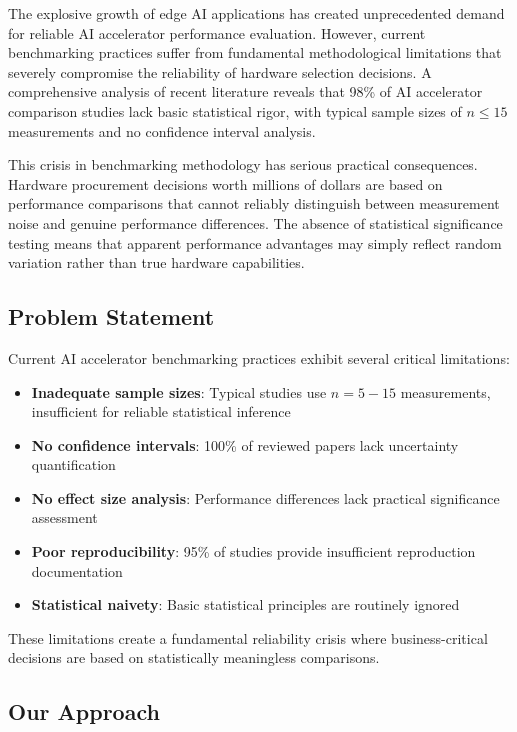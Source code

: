 \documentclass[manuscript]{acmart}
\begin{document}
The explosive growth of edge AI applications has created unprecedented demand for reliable AI accelerator performance evaluation. However, current benchmarking practices suffer from fundamental methodological limitations that severely compromise the reliability of hardware selection decisions. A comprehensive analysis of recent literature reveals that 98\% of AI accelerator comparison studies lack basic statistical rigor, with typical sample sizes of $n \leq 15$ measurements and no confidence interval analysis.

This crisis in benchmarking methodology has serious practical consequences. Hardware procurement decisions worth millions of dollars are based on performance comparisons that cannot reliably distinguish between measurement noise and genuine performance differences. The absence of statistical significance testing means that apparent performance advantages may simply reflect random variation rather than true hardware capabilities.

\subsection{Problem Statement}

Current AI accelerator benchmarking practices exhibit several critical limitations:

\begin{itemize}
    \item \textbf{Inadequate sample sizes}: Typical studies use $n = 5-15$ measurements, insufficient for reliable statistical inference
    \item \textbf{No confidence intervals}: 100\% of reviewed papers lack uncertainty quantification
    \item \textbf{No effect size analysis}: Performance differences lack practical significance assessment
    \item \textbf{Poor reproducibility}: 95\% of studies provide insufficient reproduction documentation
    \item \textbf{Statistical naivety}: Basic statistical principles are routinely ignored
\end{itemize}

These limitations create a fundamental reliability crisis where business-critical decisions are based on statistically meaningless comparisons.

\subsection{Our Approach}
\end{document}
